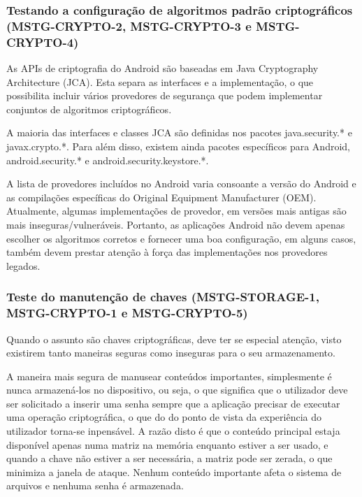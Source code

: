 \subsubsection{Testando a configuração de algoritmos padrão criptográficos (MSTG-CRYPTO-2, MSTG-CRYPTO-3 e MSTG-CRYPTO-4)}\par
\hfill\par
\hfill\par
\par As APIs de criptografia do Android são baseadas em Java Cryptography Architecture (JCA). Esta separa as interfaces e a implementação, o que possibilita incluir vários provedores de segurança que podem implementar conjuntos de algoritmos criptográficos.
\par A maioria das interfaces e classes JCA são definidas nos pacotes java.security.* e javax.crypto.*. Para além disso, existem ainda pacotes específicos para Android, android.security.* e android.security.keystore.*.

\par A lista de provedores incluídos no Android varia consoante a versão do Android e as compilações específicas do Original Equipment Manufacturer (OEM). Atualmente, algumas implementações de provedor, em versões mais antigas são mais inseguras/vulneráveis. Portanto, as aplicações Android não devem apenas escolher os algoritmos corretos e fornecer uma boa configuração, em alguns casos, também devem prestar atenção à força das implementações nos provedores legados.



\subsubsection{Teste do manutenção de chaves (MSTG-STORAGE-1, MSTG-CRYPTO-1 e MSTG-CRYPTO-5)}\par
\hfill\par
\hfill\par
\par Quando o assunto são chaves criptográficas, deve ter se especial atenção, visto existirem tanto maneiras seguras como inseguras para o seu armazenamento. 
\par A maneira mais segura de manusear conteúdos importantes, simplesmente é nunca armazená-los no dispositivo, ou seja, o que significa que o utilizador deve ser solicitado a inserir uma senha sempre que a aplicação precisar de executar uma operação criptográfica, o que do do ponto de vista da experiência do utilizador torna-se inpensável. A razão disto é que o conteúdo principal estaja disponível apenas numa matriz na memória enquanto estiver a ser usado, e quando a chave não estiver a ser necessária, a matriz pode ser zerada, o que minimiza a janela de ataque. Nenhum conteúdo importante afeta o sistema de arquivos e nenhuma senha é armazenada. 

